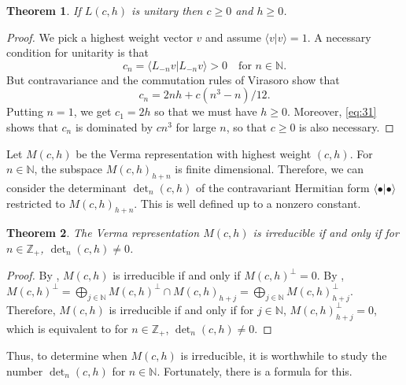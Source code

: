 \documentclass[a4paper, 12pt, reqno]{amsart}
\newtheorem{theorem}{Theorem}[section]
\theoremstyle{remark}
\numberwithin{equation}{subsection}
\begin{document}
\begin{theorem}
  \label{thr:30}
  If $L(c, h)$ is unitary then $c \ge 0$ and $h \ge 0$.
\end{theorem}

\begin{proof}
  We pick a highest weight vector $v$ and assume $\langle v| v\rangle = 1$.
  A necessary condition for unitarity is that
  \begin{equation*}
    c_n = \langle L_{-n}v| L_{-n}v\rangle > 0 \quad \text{for }n \in \mathbb{N}.
  \end{equation*}
  But contravariance and the commutation rules of Virasoro show that
  \begin{equation}
    \label{eq:31}
    c_n = 2nh + c(n^3 - n)/12.
  \end{equation}
  Putting $n = 1$, we get $c_1 = 2h$ so that we must have $h \ge 0$.
  Moreover, \eqref{eq:31} shows that $c_n$ is dominated by $cn^3$ for large $n$, so that $c \ge 0$ is also necessary.
\end{proof}

Let $M(c, h)$ be the Verma representation with highest weight $(c, h)$.
For $n \in \mathbb{N}$, the subspace $M(c, h)_{h + n}$ is finite dimensional.
Therefore, we can consider the determinant $\det_n(c, h)$ of the contravariant Hermitian form $\langle\bullet| \bullet\rangle$ restricted to $M(c, h)_{h + n}$.
This is well defined up to a nonzero constant.

\begin{theorem}
  \label{thr:31}
  The Verma representation $M(c, h)$ is irreducible if and only if for $n \in \mathbb{Z}_+$, $\det_n(c, h) \neq 0$.
\end{theorem}

\begin{proof}
  By , $M(c, h)$ is irreducible if and only if $M(c, h)^{\perp} = 0$.
  By , $M(c, h)^{\perp} = \bigoplus_{j \in \mathbb{N}}M(c, h)^{\perp} \cap M(c, h)_{h + j} = \bigoplus_{j \in \mathbb{N}}M(c, h)_{h + j}^{\perp}$.
  Therefore, $M(c, h)$ is irreducible if and only if for $j \in \mathbb{N}$, $M(c, h)_{h + j}^{\perp} = 0$, which is equivalent to for $n \in \mathbb{Z}_+$, $\det_n(c, h) \neq 0$.
\end{proof}

Thus, to determine when $M(c, h)$ is irreducible, it is worthwhile to study the number $\det_n(c, h)$ for $n \in \mathbb{N}$.
Fortunately, there is a formula for this.
\end{document}
